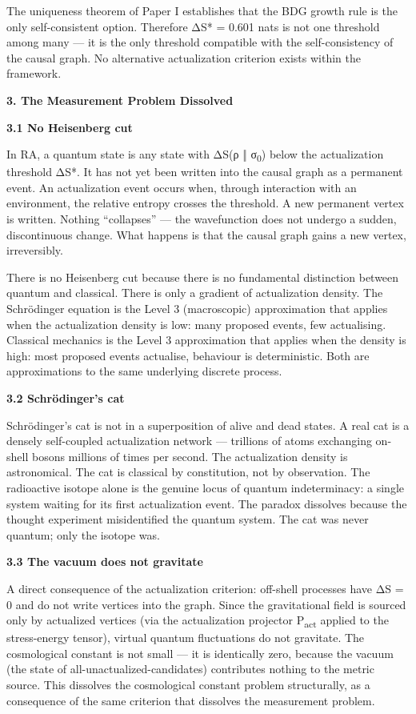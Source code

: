\documentclass[12pt,a4paper]{article}
\begin{document}
The uniqueness theorem of Paper I establishes that the BDG growth rule
is the only self-consistent option. Therefore ΔS* = 0.601 nats is not
one threshold among many --- it is the only threshold compatible with
the self-consistency of the causal graph. No alternative actualization
criterion exists within the framework.

\textbf{3. The Measurement Problem Dissolved}

\textbf{3.1 No Heisenberg cut}

In RA, a quantum state is any state with ΔS(ρ ‖ σ\textsubscript{0})
below the actualization threshold ΔS*. It has not yet been written into
the causal graph as a permanent event. An actualization event occurs
when, through interaction with an environment, the relative entropy
crosses the threshold. A new permanent vertex is written. Nothing
``collapses'' --- the wavefunction does not undergo a sudden,
discontinuous change. What happens is that the causal graph gains a new
vertex, irreversibly.

There is no Heisenberg cut because there is no fundamental distinction
between quantum and classical. There is only a gradient of actualization
density. The Schrödinger equation is the Level 3 (macroscopic)
approximation that applies when the actualization density is low: many
proposed events, few actualising. Classical mechanics is the Level 3
approximation that applies when the density is high: most proposed
events actualise, behaviour is deterministic. Both are approximations to
the same underlying discrete process.

\textbf{3.2 Schrödinger's cat}

Schrödinger's cat is not in a superposition of alive and dead states. A
real cat is a densely self-coupled actualization network --- trillions
of atoms exchanging on-shell bosons millions of times per second. The
actualization density is astronomical. The cat is classical by
constitution, not by observation. The radioactive isotope alone is the
genuine locus of quantum indeterminacy: a single system waiting for its
first actualization event. The paradox dissolves because the thought
experiment misidentified the quantum system. The cat was never quantum;
only the isotope was.

\textbf{3.3 The vacuum does not gravitate}

A direct consequence of the actualization criterion: off-shell processes
have ΔS = 0 and do not write vertices into the graph. Since the
gravitational field is sourced only by actualized vertices (via the
actualization projector P\textsubscript{act} applied to the
stress-energy tensor), virtual quantum fluctuations do not gravitate.
The cosmological constant is not small --- it is identically zero,
because the vacuum (the state of all-unactualized-candidates)
contributes nothing to the metric source. This dissolves the
cosmological constant problem structurally, as a consequence of the same
criterion that dissolves the measurement problem.
\end{document}
